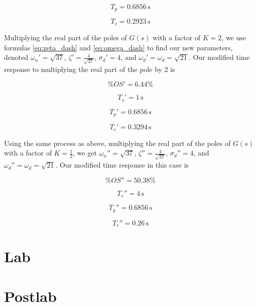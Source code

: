 \documentclass[a4paper, 12pt]{article}
\begin{document}
			\[
				T_p = 0.6856\,\text{s}
			\]

			\[
				T_r = 0.2923\,\text{s}
			\]

			Multiplying the real part of the poles of $G(s)$ with a factor of $K=2$, we use formulas \eqref{eq:zeta_dash} and \eqref{eq:omega_dash} to find our new parameters, denoted $\omega_n' = \sqrt{37}$, $\zeta' = \frac{4}{\sqrt{37}}$, $\sigma_d' = 4$, and $\omega_d' = \omega_d = \sqrt{21}$. Our modified time response to multiplying the real part of the pole by 2 is

			\[
				\%OS' = 6.44\%
			\]

			\[
				T_s' = 1\,\text{s}
			\]

			\[
				T_p' = 0.6856\,\text{s}
			\]

			\[
				T_r' = 0.3294\,\text{s}
			\]

			Using the same process as above, multiplying the real part of the poles of $G(s)$ with a factor of $K=\frac{1}{2}$, we get $\omega_n'' = \sqrt{37}$, $\zeta'' = \frac{4}{\sqrt{37}}$, $\sigma_d'' = 4$, and $\omega_d'' = \omega_d = \sqrt{21}$. Our modified time response in this case is

			\[
				\%OS'' = 50.38\%
			\]

			\[
				T_s'' = 4\,\text{s}
			\]

			\[
				T_p'' = 0.6856\,\text{s}
			\]

			\[
				T_r'' = 0.26\,\text{s}
			\]


	\section{Lab} %
	\label{sec:lab}
		

	\section{Postlab} %
	\label{sec:postlab}
		
\end{document}
